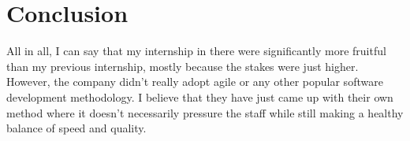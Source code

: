\chapter{Conclusion}
All in all, I can say that my internship in there were significantly more 
fruitful than my previous internship, mostly because the stakes were just 
higher. However, the company didn't really adopt agile or any other popular 
software development methodology. I believe that they have just came up 
with their own method where it doesn't necessarily pressure the staff 
while still making a healthy balance of speed and quality.
